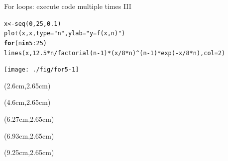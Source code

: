 \documentclass[xcolor=table,           xcolor=dvipsnames]{beamer}\usepackage[]{graphicx}\usepackage[]{color}
\makeatletter
\newcommand{\hlnum}[1]{\textcolor[rgb]{0,0,0}{#1}}
\newcommand{\hlstr}[1]{\textcolor[rgb]{0.545,0.137,0.137}{#1}}
\newcommand{\hlopt}[1]{\textcolor[rgb]{0,0,0}{#1}}
\newcommand{\hlstd}[1]{\textcolor[rgb]{0,0,0}{#1}}
\newcommand{\hlkwa}[1]{\textcolor[rgb]{1,0,0}{\textbf{#1}}}
\newcommand{\hlkwb}[1]{\textcolor[rgb]{0,0,0}{#1}}
\newcommand{\hlkwc}[1]{\textcolor[rgb]{1,0,1}{#1}}
\newcommand{\hlkwd}[1]{\textcolor[rgb]{0,0,1}{#1}}
\newenvironment{kframe}{%
 \def\at@end@of@kframe{}%
 \ifinner\ifhmode%
  \def\at@end@of@kframe{\end{minipage}}%
  \begin{minipage}{\columnwidth}%
 \fi\fi%
 \def\FrameCommand##1{\hskip\@totalleftmargin \hskip-\fboxsep
 \colorbox{shadecolor}{##1}\hskip-\fboxsep
     \hskip-\linewidth \hskip-\@totalleftmargin \hskip\columnwidth}%
 \MakeFramed {\advance\hsize-\width
   \@totalleftmargin\z@ \linewidth\hsize
   \@setminipage}}%
 {\par\unskip\endMakeFramed%
 \at@end@of@kframe}
\newenvironment{knitrout}{}{} %
\makeatother
\begin{document}

\begin{frame}[fragile]{For loops: execute code multiple times III}
\begin{knitrout}\footnotesize
{}\color{fgcolor}\begin{kframe}
\begin{alltt}
\hlstd{x} \hlkwb{<-} \hlkwd{seq}\hlstd{(}\hlnum{0}\hlstd{,}\hlnum{25}\hlstd{,}\hlnum{0.1}\hlstd{)}
\hlkwd{plot}\hlstd{(x,x,} \hlkwc{type}\hlstd{=}\hlstr{"n"}\hlstd{,} \hlkwc{ylab}\hlstd{=}\hlstr{"y = f(x,n)"}\hlstd{)}
\hlkwa{for} \hlstd{(n} \hlkwa{in} \hlnum{5}\hlopt{:}\hlnum{25}\hlstd{)}
\hlkwd{lines}\hlstd{(x,} \hlnum{12.5}\hlopt{*}\hlstd{n}\hlopt{/}\hlkwd{factorial}\hlstd{(n}\hlopt{-}\hlnum{1}\hlstd{)}\hlopt{*}\hlstd{(x}\hlopt{/}\hlnum{8}\hlopt{*}\hlstd{n)}\hlopt{^}\hlstd{(n}\hlopt{-}\hlnum{1}\hlstd{)}\hlopt{*}\hlkwd{exp}\hlstd{(}\hlopt{-}\hlstd{x}\hlopt{/}\hlnum{8}\hlopt{*}\hlstd{n),} \hlkwc{col}\hlstd{=}\hlnum{2}\hlstd{)}
\end{alltt}
\end{kframe}

{\centering \texttt{[image: ./fig/for5-1]} 

}



\end{knitrout}
\begin{textblock*}{0.2cm}(2.6cm,2.65cm)
\vspace{0.45cm} ~
\end{textblock*}
%
\begin{textblock*}{0.2cm}(4.6cm,2.65cm)
\vspace{0.45cm} ~
\end{textblock*}
%
\begin{textblock*}{0.2cm}(6.27cm,2.65cm)
\vspace{0.45cm} ~
\end{textblock*}
%
\begin{textblock*}{0.2cm}(6.93cm,2.65cm)
\vspace{0.45cm} ~
\end{textblock*}
%
\begin{textblock*}{0.2cm}(9.25cm,2.65cm)
\vspace{0.45cm} ~
\end{textblock*}
%
\end{frame}

\end{document}
